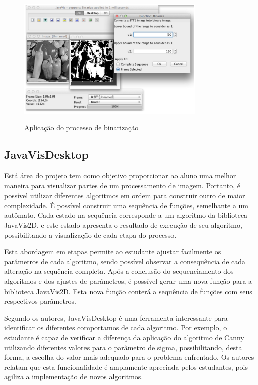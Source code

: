\documentclass[
	12pt,				%
	oneside,			%
	a4paper,			%
	english,			%
	french,				%
	spanish,			%
	brazil,				%
	]{abntex2}
\begin{document}
\begin{figure}[ht]
\centering
\caption{Aplicação do processo de binarização }
\includegraphics[width=0.8\textwidth]{imagens/javavis_2d.png}
\label{fig:javavis_2d}
\end{figure}

\subsection{JavaVisDesktop}

Está área do projeto tem como objetivo proporcionar ao aluno uma melhor maneira para visualizar partes de um processamento de imagem. Portanto, é possível utilizar diferentes algoritmos em ordem para construir outro de maior complexidade. É possível construir uma sequência de funções, semelhante a um autômato. Cada estado na sequência corresponde a um algoritmo da biblioteca JavaVis2D, e este estado apresenta o resultado de execução de seu algoritmo, possibilitando a visualização de cada etapa do processo.

Esta abordagem em etapas permite ao estudante ajustar facilmente os parâmetros de cada algoritmo, sendo possível observar a consequência de cada alteração na sequência completa. Após a conclusão do sequenciamento dos algoritmos e dos ajustes de parâmetros, é possível gerar uma nova função para a biblioteca JavaVis2D. Esta nova função conterá a sequência de funções com seus respectivos parâmetros.

Segundo os autores, JavaVisDesktop é uma ferramenta interessante para identificar os diferentes comportamos de cada algoritmo. Por exemplo, o estudante é capaz de verificar a diferença da aplicação do algoritmo de Canny utilizando diferentes valores para o parâmetro de sigma, possibilitando, desta forma, a escolha do valor mais adequado para o problema enfrentado. Os autores relatam que esta funcionalidade é amplamente apreciada pelos estudantes, pois agiliza a implementação de novos algoritmos.
\end{document}
